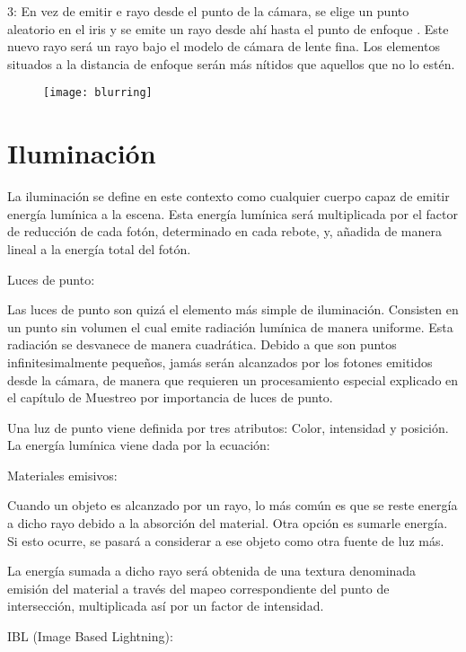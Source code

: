 	3: En vez de emitir e rayo desde el punto de la cámara, se elige un punto aleatorio en el iris  y se emite un rayo desde ahí hasta el punto de enfoque . Este nuevo rayo será un rayo bajo el modelo de cámara de lente fina. Los elementos situados a la distancia de enfoque  serán más nítidos que aquellos que no lo estén.

	\begin{figure}
		\centering
		\texttt{[image: blurring]}
		\caption{}
		\label{fig:label}
	\end{figure}


	
	\section{Iluminación}
	
	La iluminación se define en este contexto como cualquier cuerpo capaz de emitir energía lumínica a la escena. Esta energía lumínica será multiplicada por el factor de reducción de cada fotón, determinado en cada rebote, y, añadida de manera lineal a la energía total del fotón.

	Luces de punto:

	Las luces de punto son quizá el elemento más simple de iluminación. Consisten en un punto sin volumen el cual emite radiación lumínica de manera uniforme. Esta radiación se desvanece de manera cuadrática. Debido a que son puntos infinitesimalmente pequeños, jamás serán alcanzados por los fotones emitidos desde la cámara, de manera que requieren un procesamiento especial explicado en el capítulo de Muestreo por importancia de luces de punto.

	Una luz de punto viene definida por tres atributos: Color, intensidad y posición. La energía lumínica viene dada por la ecuación:
	
	Materiales emisivos:

	Cuando un objeto es alcanzado por un rayo, lo más común es que se reste energía a dicho rayo debido a la absorción del material. Otra opción es sumarle energía. Si esto ocurre, se pasará a considerar a ese objeto como otra fuente de luz más.

	La energía sumada a dicho rayo será obtenida de una textura denominada emisión del material a través del mapeo correspondiente del punto de intersección, multiplicada así por un factor de intensidad.

	IBL (Image Based Lightning):

